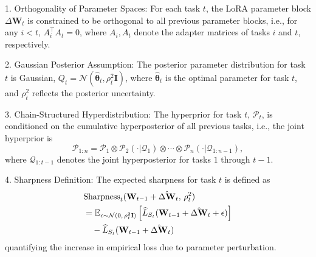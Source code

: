 \documentclass[letterpaper]{article} %
\begin{document}
1. Orthogonality of Parameter Spaces: For each task $t$, the LoRA parameter block $\Delta\mathbf{W}_t$ is constrained to be orthogonal to all previous parameter blocks, i.e., for any $i < t$, $A_i^\top A_t = 0$, where $A_i, A_t$ denote the adapter matrices of tasks $i$ and $t$, respectively.

2. Gaussian Posterior Assumption: The posterior parameter distribution for task $t$ is Gaussian, $Q_t = \mathcal{N}(\hat{\boldsymbol{\theta}}_t, \rho_t^2 \mathbf{I})$, where $\hat{\boldsymbol{\theta}}_t$ is the optimal parameter for task $t$, and $\rho_t^2$ reflects the posterior uncertainty.

3. Chain-Structured Hyperdistribution: The hyperprior for task $t$, $\mathcal{P}_t$, is conditioned on the cumulative hyperposterior of all previous tasks, i.e., the joint hyperprior is
   $$
   \mathcal{P}_{1:n} = \mathcal{P}_1 \otimes \mathcal{P}_2(\cdot|\mathcal{Q}_1) \otimes \cdots \otimes \mathcal{P}_n(\cdot|\mathcal{Q}_{1:n-1}),
   $$ where $\mathcal{Q}_{1:t-1}$ denotes the joint hyperposterior for tasks $1$ through $t-1$.

4. Sharpness Definition: The expected sharpness for task $t$ is defined as
\begin{align}
&\mathrm{Sharpness}_t(\mathbf{W}_{t-1} + \hat{\Delta\mathbf{W}}_t,\, \rho_t^2) \notag\\
& = \mathbb{E}_{\epsilon \sim \mathcal{N}(0,\, \rho_t^2 \mathbf{I})}
\left[ \widehat{L}_{S_t}(\mathbf{W}_{t-1} + \hat{\Delta\mathbf{W}}_t + \epsilon) \right] \notag\\
&\quad - \widehat{L}_{S_t}(\mathbf{W}_{t-1} + \hat{\Delta\mathbf{W}}_t) \notag
\end{align}
quantifying the increase in empirical loss due to parameter perturbation.
\end{document}
